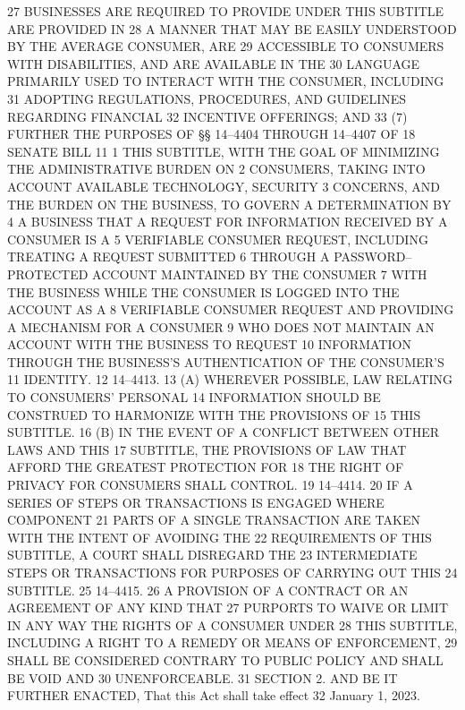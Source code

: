 27 BUSINESSES ARE REQUIRED TO PROVIDE UNDER THIS SUBTITLE ARE PROVIDED IN
28 A MANNER THAT MAY BE EASILY UNDERSTOOD BY THE AVERAGE CONSUMER, ARE
29 ACCESSIBLE TO CONSUMERS WITH DISABILITIES, AND ARE AVAILABLE IN THE
30 LANGUAGE PRIMARILY USED TO INTERACT WITH THE CONSUMER, INCLUDING
31 ADOPTING REGULATIONS, PROCEDURES, AND GUIDELINES REGARDING FINANCIAL
32 INCENTIVE OFFERINGS; AND
33 (7) FURTHER THE PURPOSES OF §§ 14–4404 THROUGH 14–4407 OF 
18 SENATE BILL 11
1 THIS SUBTITLE, WITH THE GOAL OF MINIMIZING THE ADMINISTRATIVE BURDEN ON
2 CONSUMERS, TAKING INTO ACCOUNT AVAILABLE TECHNOLOGY, SECURITY
3 CONCERNS, AND THE BURDEN ON THE BUSINESS, TO GOVERN A DETERMINATION BY
4 A BUSINESS THAT A REQUEST FOR INFORMATION RECEIVED BY A CONSUMER IS A
5 VERIFIABLE CONSUMER REQUEST, INCLUDING TREATING A REQUEST SUBMITTED
6 THROUGH A PASSWORD–PROTECTED ACCOUNT MAINTAINED BY THE CONSUMER
7 WITH THE BUSINESS WHILE THE CONSUMER IS LOGGED INTO THE ACCOUNT AS A
8 VERIFIABLE CONSUMER REQUEST AND PROVIDING A MECHANISM FOR A CONSUMER
9 WHO DOES NOT MAINTAIN AN ACCOUNT WITH THE BUSINESS TO REQUEST
10 INFORMATION THROUGH THE BUSINESS’S AUTHENTICATION OF THE CONSUMER’S
11 IDENTITY.
12 14–4413.
13 (A) WHEREVER POSSIBLE, LAW RELATING TO CONSUMERS’ PERSONAL
14 INFORMATION SHOULD BE CONSTRUED TO HARMONIZE WITH THE PROVISIONS OF
15 THIS SUBTITLE.
16 (B) IN THE EVENT OF A CONFLICT BETWEEN OTHER LAWS AND THIS
17 SUBTITLE, THE PROVISIONS OF LAW THAT AFFORD THE GREATEST PROTECTION FOR
18 THE RIGHT OF PRIVACY FOR CONSUMERS SHALL CONTROL.
19 14–4414.
20 IF A SERIES OF STEPS OR TRANSACTIONS IS ENGAGED WHERE COMPONENT
21 PARTS OF A SINGLE TRANSACTION ARE TAKEN WITH THE INTENT OF AVOIDING THE
22 REQUIREMENTS OF THIS SUBTITLE, A COURT SHALL DISREGARD THE
23 INTERMEDIATE STEPS OR TRANSACTIONS FOR PURPOSES OF CARRYING OUT THIS
24 SUBTITLE.
25 14–4415.
26 A PROVISION OF A CONTRACT OR AN AGREEMENT OF ANY KIND THAT
27 PURPORTS TO WAIVE OR LIMIT IN ANY WAY THE RIGHTS OF A CONSUMER UNDER
28 THIS SUBTITLE, INCLUDING A RIGHT TO A REMEDY OR MEANS OF ENFORCEMENT,
29 SHALL BE CONSIDERED CONTRARY TO PUBLIC POLICY AND SHALL BE VOID AND
30 UNENFORCEABLE.
31 SECTION 2. AND BE IT FURTHER ENACTED, That this Act shall take effect
32 January 1, 2023.